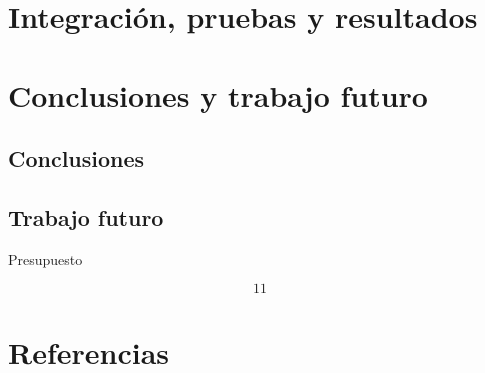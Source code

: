 \documentclass{article} %
\begin{document}
\noindent 

\noindent 


\section{ Integraci\'{o}n, pruebas y resultados}

\noindent 

\noindent 


\section{ Conclusiones y trabajo futuro}


\subsection{ Conclusiones}

\noindent 


\subsection{ Trabajo futuro}

\noindent 

\noindent 

\noindent Presupuesto

\noindent \underbar{}

\noindent \underbar{}

\noindent \underbar{}
\[11\] 

{\bf }

\noindent 
\section{Referencias}

\noindent 
\end{document}
